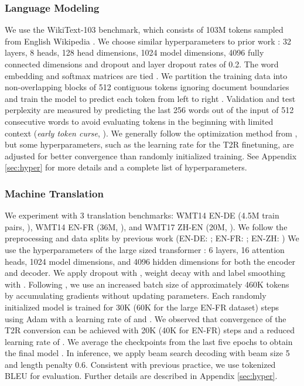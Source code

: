 \documentclass[11pt,a4paper]{article}
\newcommand{\TRNN}{T2R\xspace}
\begin{document}
\subsubsection{Language Modeling}
We use the WikiText-103 benchmark, which consists of 103M tokens sampled from English Wikipedia \cite{wiki103}.
We choose similar hyperparameters to prior work \cite{Baevski2019AdaptiveIR, layerdrop}: 32 layers, 8 heads, 128 head dimensions, 1024 model dimensions, 4096 fully connected dimensions and dropout \cite{dropout} and layer dropout rates of 0.2.
The word embedding and softmax matrices are tied \cite{Press2017UsingTO, Inan2017TyingWV}.
We partition the training data into non-overlapping blocks of 512 contiguous tokens ignoring document boundaries and train the model to predict each token from left to right \cite{Baevski2019AdaptiveIR}.
Validation and test perplexity are measured by predicting the last 256 words out of the input of 512 consecutive words to avoid evaluating tokens in the beginning with limited context (\textit{early token curse}, \citealp{shortformer}).
We generally follow the optimization method from \citet{Baevski2019AdaptiveIR}, but some hyperparameters, such as the learning rate for the \TRNN finetuning, are adjusted for better convergence than randomly initialized training.
See Appendix \ref{sec:hyper} for more details and a complete list of hyperparameters.


\subsubsection{Machine Translation}
We experiment with 3 translation benchmarks: WMT14 EN-DE (4.5M train pairs, \citealp{wmt2016-findings}), WMT14 EN-FR (36M, \citealp{wmt2014-findings}), and WMT17 ZH-EN (20M, \citealp{wmt2017-findings}).
We follow the preprocessing and data splits by previous work (EN-DE: \citealp{Vaswani2017AttentionIA}; EN-FR: \citealp{Gehring2017ConvolutionalST}; EN-ZH: \citealp{Hassan2018AchievingHP})
We use the hyperparameters of the large sized transformer \cite{Vaswani2017AttentionIA}: 6 layers, 16 attention heads, 1024 model dimensions, and 4096 hidden dimensions for both the encoder and decoder.
We apply dropout with , weight decay with  and label smoothing with .
Following \citet{Ott2018ScalingNM}, we use an increased batch size of approximately 460K tokens by accumulating gradients without updating parameters.
Each randomly initialized model is trained for 30K (60K for the large EN-FR dataset) steps using Adam with a learning rate of  and  \cite{Kingma2014AdamAM}.
We observed that convergence of the \TRNN conversion can be achieved with 20K (40K for EN-FR) steps and a reduced learning rate of .
We average the checkpoints from the last five epochs to obtain the final model \cite{Vaswani2017AttentionIA}.
In inference, we apply beam search decoding with beam size 5 and length penalty 0.6.
Consistent with previous practice, we use tokenized BLEU \cite{Papineni2001BleuAM} for evaluation.
Further details are described in Appendix \ref{sec:hyper}.
\end{document}

